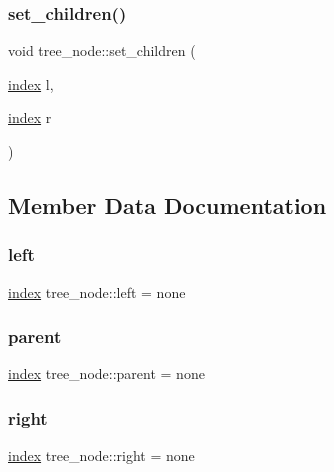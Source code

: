 \subsubsection{\texorpdfstring{set\+\_\+children()}{set\_children()}}
{\footnotesize\ttfamily void tree\+\_\+node\+::set\+\_\+children (\begin{DoxyParamCaption}\item[{\hyperlink{tree__gen_8cpp_a7376ecf9f645bcbaa2f0459e17d7588f}{index}}]{l,  }\item[{\hyperlink{tree__gen_8cpp_a7376ecf9f645bcbaa2f0459e17d7588f}{index}}]{r }\end{DoxyParamCaption})\hspace{0.3cm}{\ttfamily [inline]}}



\subsection{Member Data Documentation}
\mbox{\label{structtree__node_a6ee3ea07f568423adde3b6911ea3b041}} 
\subsubsection{\texorpdfstring{left}{left}}
{\footnotesize\ttfamily \hyperlink{tree__gen_8cpp_a7376ecf9f645bcbaa2f0459e17d7588f}{index} tree\+\_\+node\+::left = none}

\mbox{\label{structtree__node_ab8bbd1b843e135810fc96529bc452d22}} 
\subsubsection{\texorpdfstring{parent}{parent}}
{\footnotesize\ttfamily \hyperlink{tree__gen_8cpp_a7376ecf9f645bcbaa2f0459e17d7588f}{index} tree\+\_\+node\+::parent = none}

\mbox{\label{structtree__node_a244a10f0fa615392414c301291ba2c47}} 
\subsubsection{\texorpdfstring{right}{right}}
{\footnotesize\ttfamily \hyperlink{tree__gen_8cpp_a7376ecf9f645bcbaa2f0459e17d7588f}{index} tree\+\_\+node\+::right = none}


